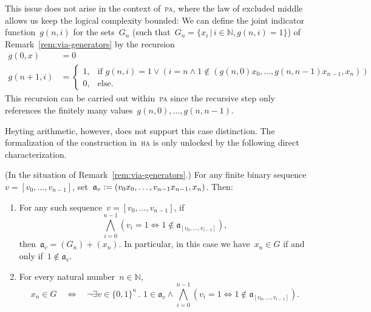 \documentclass[envcountsect,envcountsame,runningheads]{llncs}
\newcommand{\aaa}{\mathfrak{a}}
\newcommand{\NN}{\mathbb{N}}
\newcommand{\defeq}{\vcentcolon=}
\renewcommand{\_}{\mathpunct{.}\,}
\begin{document}
This issue does not arise in the context of~\textsc{pa}, where the law of
excluded middle allows us keep the logical complexity bounded: We can define
the joint indicator function~$g(n,i)$ for the sets~$G_n$ (such that~$G_n = \{
x_i \,|\, i \in \NN, g(n,i) = 1 \}$) of Remark~\ref{rem:via-generators} by the recursion
\begin{align*}
  g(0,x) &= 0 \\
  g(n+1,i) &= \begin{cases}
    1, & \text{if $g(n,i) = 1 \vee (i = n \wedge 1 \not\in
    (g(n,0)x_0,\ldots,g(n,n-1)x_{n-1},x_n))$} \\
    0, & \text{else.}
  \end{cases}
\end{align*}
This recursion can be carried out within~\textsc{pa} since the recursive step
only references the finitely many values~$g(n,0),\ldots,g(n,n-1)$.

Heyting arithmetic, however, does not support this case distinction. The
formalization of the construction in~\textsc{ha} is only unlocked by the following
direct characterization.

\begin{lemma}\label{lemma:uniform-char}(In the situation of Remark~\ref{rem:via-generators}.)
For any finite binary sequence~$v = [v_0,\ldots,v_{n-1}]$, set~$\aaa_v
\defeq (v_0x_0,\ldots,v_{n-1}x_{n-1},x_n)$. Then:
\begin{enumerate}
\item For any such sequence~$v = [v_0,\ldots,v_{n-1}]$, if
\[ \bigwedge_{i=0}^{n-1} (v_i = 1 \Leftrightarrow 1 \not\in \aaa_{[v_0,\ldots,v_{i-1}]}), \]
then~$\aaa_v = (G_n) + (x_n)$.
In particular, in this case we have~$x_n \in G$ if and only if~$1 \not\in \aaa_v$.
\item For every natural number~$n \in \NN$,
\[ x_n \in G \quad\Longleftrightarrow\quad \neg
  \exists v \in \{0,1\}^n\_
    1 \in \aaa_v \wedge
      \bigwedge_{i=0}^{n-1} (v_i = 1 \Leftrightarrow 1 \not\in \aaa_{[v_0,\ldots,v_{i-1}]}). \]
\end{enumerate}
\end{lemma}
\end{document}
